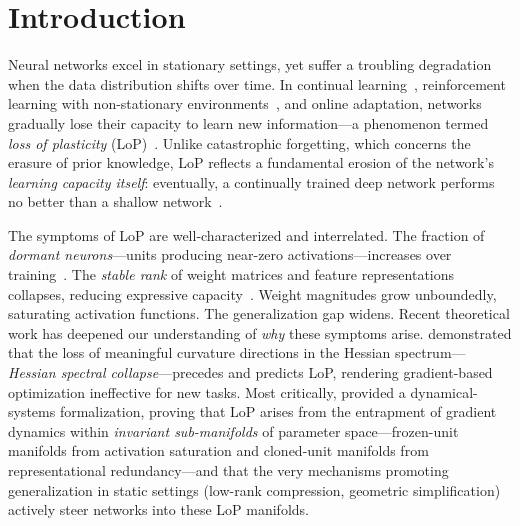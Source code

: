 \documentclass{article}
\begin{document}
\section{Introduction}
\label{sec:intro}

Neural networks excel in stationary settings, yet suffer a troubling degradation when the data distribution shifts over time. In continual learning~\citep{zenke2017continual}, reinforcement learning with non-stationary environments~\citep{schulman2017proximal, abbas2023loss}, and online adaptation, networks gradually lose their capacity to learn new information---a phenomenon termed \emph{loss of plasticity} (LoP)~\citep{lyle2023understanding, dohare2024loss}. Unlike catastrophic forgetting, which concerns the erasure of prior knowledge, LoP reflects a fundamental erosion of the network's \emph{learning capacity itself}: eventually, a continually trained deep network performs no better than a shallow network~\citep{dohare2024loss}.

The symptoms of LoP are well-characterized and interrelated. The fraction of \emph{dormant neurons}---units producing near-zero activations---increases over training~\citep{sokar2023dormant}. The \emph{stable rank} of weight matrices and feature representations collapses, reducing expressive capacity~\citep{he2024spectral}. Weight magnitudes grow unboundedly, saturating activation functions. The generalization gap widens. Recent theoretical work has deepened our understanding of \emph{why} these symptoms arise. \citet{lewandowski2024curvature} demonstrated that the loss of meaningful curvature directions in the Hessian spectrum---\emph{Hessian spectral collapse}---precedes and predicts LoP, rendering gradient-based optimization ineffective for new tasks. Most critically, \citet{joudaki2026barriers} provided a dynamical-systems formalization, proving that LoP arises from the entrapment of gradient dynamics within \emph{invariant sub-manifolds} of parameter space---frozen-unit manifolds from activation saturation and cloned-unit manifolds from representational redundancy---and that the very mechanisms promoting generalization in static settings (low-rank compression, geometric simplification) actively steer networks into these LoP manifolds.
\end{document}
